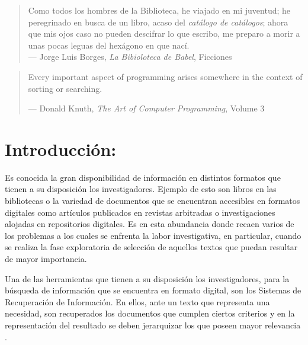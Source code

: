 \documentclass[
  12pt,
  openany]{book}
\begin{document}
\newpage
\thispagestyle{empty}
\vspace*{5cm}
\hfill
\begin{minipage}{0.70\textwidth}
\begin{quote}
Como todos los hombres de la Biblioteca, he viajado en mi juventud; he peregrinado en busca de un libro, acaso del \emph{catálogo de catálogos}; ahora que mis ojos caso no pueden descifrar lo que escribo, me preparo a morir a unas pocas leguas del hexágono en que nací.\\
--- Jorge Luis Borges, \textit{La Bibioloteca de Babel}, Ficciones
\end{quote}
\hspace*{2cm}

\begin{quote}
Every important aspect of programming arises somewhere in the context of sorting or searching.

--- Donald Knuth, \textit{The Art of Computer Programming}, Volume 3
\end{quote}
\end{minipage}

\thispagestyle{empty}
\maketitle



{
\setcounter{tocdepth}{4}
\tableofcontents
}
\listoffigures
\listoftables
\clearpage
{}

\hypertarget{introduccion}{%
\chapter{Introducción:}\label{introduccion}}

Es conocida la gran disponibilidad de información en distintos formatos que tienen a su disposición los investigadores. Ejemplo de esto son libros en las bibliotecas o la variedad de documentos que se encuentran accesibles en formatos digitales como artículos publicados en revistas arbitradas o investigaciones alojadas en repositorios digitales. Es en esta abundancia donde recaen varios de los problemas a los cuales se enfrenta la labor investigativa, en particular, cuando se realiza la fase exploratoria de selección de aquellos textos que puedan resultar de mayor importancia.

Una de las herramientas que tienen a su disposición los investigadores, para la búsqueda de información que se encuentra en formato digital, son los Sistemas de Recuperación de Información. En ellos, ante un texto que representa una necesidad, son recuperados los documentos que cumplen ciertos criterios y en la representación del resultado se deben jerarquizar los que poseen mayor relevancia \citep{manning2008}.
\end{document}

